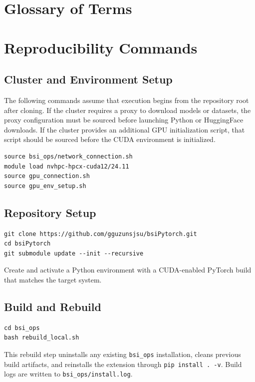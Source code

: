 \section{Glossary of Terms}\label{apx:glossary}


\section{Reproducibility Commands}\label{apx:reproducibility}
\subsection{Cluster and Environment Setup}
The following commands assume that execution begins from the repository root after cloning. If the cluster requires a proxy to download models or datasets, the proxy configuration must be sourced before launching Python or HuggingFace downloads. If the cluster provides an additional GPU initialization script, that script should be sourced before the CUDA environment is initialized.

\begin{lstlisting}
source bsi_ops/network_connection.sh
module load nvhpc-hpcx-cuda12/24.11
source gpu_connection.sh
source gpu_env_setup.sh
\end{lstlisting}

\subsection{Repository Setup}
\begin{lstlisting}
git clone https://github.com/gguzunsjsu/bsiPytorch.git
cd bsiPytorch
git submodule update --init --recursive
\end{lstlisting}

Create and activate a Python environment with a CUDA-enabled PyTorch build that matches the target system.

\subsection{Build and Rebuild}
\begin{lstlisting}
cd bsi_ops
bash rebuild_local.sh
\end{lstlisting}

This rebuild step uninstalls any existing \texttt{bsi\_ops} installation, cleans previous build artifacts, and reinstalls the extension through \texttt{pip install . -v}. Build logs are written to \texttt{bsi\_ops/install.log}.

